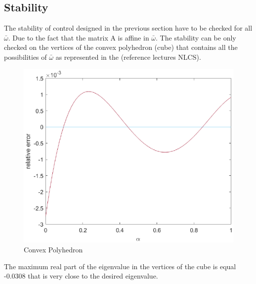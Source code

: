 \subsection{Stability}
The stability of control designed in the previous section have to be checked for all $\bar{\omega}$. Due to the fact that the matrix A is affine in $\bar{\omega}$. The stability can be only checked on the vertices of the convex polyhedron (cube) that contains all the possibilities of $\bar{\omega}$ as represented in the  (reference lectures NLCS).
\begin{figure}[H]
	\centering
	\includegraphics[width=1\linewidth]{figures/rel_err.eps}
	\caption{Convex Polyhedron}
	\label{fig:sta_PID}
\end{figure} 
The maximum real part of the eigenvalue in the vertices of the cube is equal -0.0308 that is very close to the desired eigenvalue.